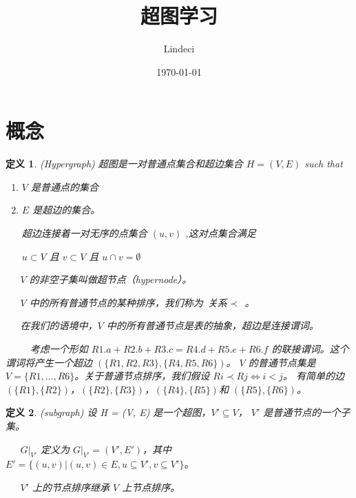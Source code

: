 \documentclass[fontset=none]{ctexart}
\title{超图学习}
\author{Lindeci}
\date{\today}
\begin{document}
\maketitle
\tableofcontents


\section{概念}

\newtheorem{definition}{定义}

\begin{definition}{(Hypergraph)}
    超图是一对普通点集合和超边集合 $H = (V,E)$ such that
    \begin{enumerate}
    \item $V$ 是普通点的集合
    \item $E$ 是超边的集合。
    
    超边连接着一对无序的点集合 $(u, v)$ ,这对点集合满足 
    
    $u \subset V$ 且 $v \subset V$ 且 $u \cap v = \emptyset$
    \end{enumerate}

    \ \ \ $V$ 的非空子集叫做超节点（hypernode）。

    \ \ \ $V$ 中的所有普通节点的某种排序，我们称为\ 关系$\prec$\ 。

    \ \ \ 在我们的语境中，$V$ 中的所有普通节点是表的抽象，超边是连接谓词。

    \ \ \ \ \ 考虑一个形如 $R1.a + R2.b + R3.c = R4.d + R5.e + R6.f$ 的联接谓词。这个谓词将产生一个超边 $(\{R1, R2, R3\}, \{R4, R5, R6\})$。
    $V$ 的普通节点集是 $V = \{R1, \ldots , R6\}$。关于普通节点排序，我们假设 $Ri \prec Rj \Leftrightarrow i < j$。
    有简单的边 $(\{R1\},\{R2\})$，$(\{R2\},\{R3\})$，$(\{R4\},\{R5\})$和 $(\{R5\}, \{R6\})$。
\end{definition}

\begin{definition}{(subgraph)}
    设 H = (V, E) 是一个超图，$V' \subseteq V$， $V'$ 是普通节点的一个子集。

    \ \ \ $G|_{V'}$ 定义为 $G|_{V'} = (V',E')$，其中 $E' = \{(u,v)|(u,v) \in E,u \subseteq V',v \subseteq V'\}$。
    
    \ \ \ $V'$ 上的节点排序继承 $V$ 上节点排序。
\end{definition}
\end{document}
